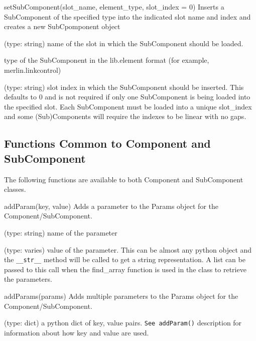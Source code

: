 \begin{functiondoc}{setSubComponent(slot_name, element_type, slot_index = 0)}
  {Inserts a SubComponent of the specified type into the indicated slot name and index and creates a new SubCpomponent object}

   (type: string) name of the slot in which the
  SubComponent should be loaded.

   type of the SubComponent in the lib.element
  format (for example, merlin.linkcontrol)

   (type: string) slot index in which the
  SubComponent should be inserted.  This defaults to 0 and is not
  required if only one SubComponent is being loaded into the specified
  slot.  Each SubComponent must be loaded into a unique slot\_index
  and some (Sub)Components will require the indexes to be linear with
  no gaps.

\end{functiondoc}


\subsection{Functions Common to Component and SubComponent}

The following functions are available to both Component and SubComponent classes.

\begin{functiondoc}{addParam(key, value)}
  { Adds a parameter to the Params object for the Component/SubComponent.}

   (type: string) name of the parameter

   (type: varies) value of the parameter.  This can be
  almost any python object and the \lstinline{__str__} method will be
  called to get a string representation.  A list can be passed to this
  call when the find\_array function is used in the class to retrieve
  the parameters.

\noreturn
\end{functiondoc}

\begin{functiondoc}{addParams(params)}
  { Adds multiple parameters to the Params object for the Component/SubComponent.}

   (type: dict) a python dict of key, value pairs.
  \lstinline{See addParam()} description for information about how key
  and value are used.

\noreturn
\end{functiondoc}

